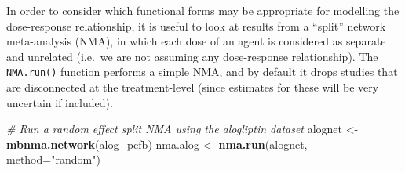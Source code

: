 \documentclass[]{article}
\newenvironment{Shaded}{\begin{snugshade}}{\end{snugshade}}
\newcommand{\CommentTok}[1]{\textcolor[rgb]{0.56,0.35,0.01}{\textit{#1}}}
\newcommand{\DataTypeTok}[1]{\textcolor[rgb]{0.13,0.29,0.53}{#1}}
\newcommand{\KeywordTok}[1]{\textcolor[rgb]{0.13,0.29,0.53}{\textbf{#1}}}
\newcommand{\NormalTok}[1]{#1}
\newcommand{\StringTok}[1]{\textcolor[rgb]{0.31,0.60,0.02}{#1}}
\begin{document}
In order to consider which functional forms may be appropriate for
modelling the dose-response relationship, it is useful to look at
results from a ``split'' network meta-analysis (NMA), in which each dose
of an agent is considered as separate and unrelated (i.e.~we are not
assuming any dose-response relationship). The \texttt{NMA.run()}
function performs a simple NMA, and by default it drops studies that are
disconnected at the treatment-level (since estimates for these will be
very uncertain if included).

\begin{Shaded}
\begin{Highlighting}[]
\CommentTok{# Run a random effect split NMA using the alogliptin dataset}
\NormalTok{alognet <-}\StringTok{ }\KeywordTok{mbnma.network}\NormalTok{(alog_pcfb)}
\NormalTok{nma.alog <-}\StringTok{ }\KeywordTok{nma.run}\NormalTok{(alognet, }\DataTypeTok{method=}\StringTok{"random"}\NormalTok{)}
\end{Highlighting}
\end{Shaded}
\end{document}
